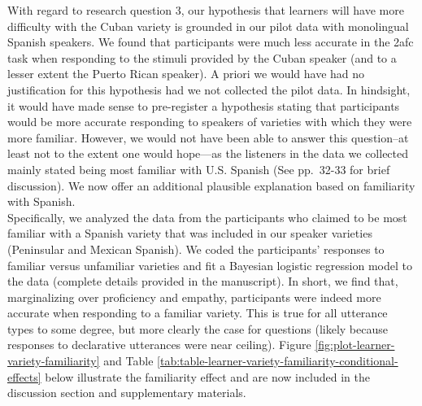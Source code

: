 \documentclass[]{article}
\begin{document}
With regard to research question 3, our hypothesis that learners will have more difficulty with the Cuban variety is grounded in our pilot data with monolingual Spanish speakers.
We found that participants were much less accurate in the 2afc task when responding to the stimuli provided by the Cuban speaker (and to a lesser extent the Puerto Rican speaker).
A priori we would have had no justification for this hypothesis had we not collected the pilot data.
In hindsight, it would have made sense to pre-register a hypothesis stating that participants would be more accurate responding to speakers of varieties with which they were more familiar.
However, we would not have been able to answer this question--at least not to the extent one would hope---as the listeners in the data we collected mainly stated being most familiar with U.S. Spanish (See pp.~32-33 for brief discussion).
We now offer an additional plausible explanation based on familiarity with Spanish.\\
Specifically, we analyzed the data from the participants who claimed to be most familiar with a Spanish variety that was included in our speaker varieties (Peninsular and Mexican Spanish).
We coded the participants' responses to familiar versus unfamiliar varieties and fit a Bayesian logistic regression model to the data (complete details provided in the manuscript).
In short, we find that, marginalizing over proficiency and empathy, participants were indeed more accurate when responding to a familiar variety.
This is true for all utterance types to some degree, but more clearly the case for questions (likely because responses to declarative utterances were near ceiling).
Figure \ref{fig:plot-learner-variety-familiarity} and Table \ref{tab:table-learner-variety-familiarity-conditional-effects} below illustrate the familiarity effect and are now included in the discussion section and supplementary materials.

\clearpage
\end{document}
